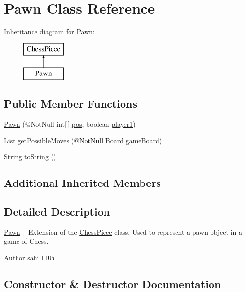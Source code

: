\hypertarget{class_pawn}{}\section{Pawn Class Reference}
\label{class_pawn}
Inheritance diagram for Pawn\+:\begin{figure}[H]
\begin{center}
\leavevmode
\includegraphics[height=2.000000cm]{class_pawn}
\end{center}
\end{figure}
\subsection*{Public Member Functions}
\begin{DoxyCompactItemize}
\item 
\mbox{\hyperlink{class_pawn_a2859eebd000b0e2b0edd2457e2ee6df2}{Pawn}} (@Not\+Null int\mbox{[}$\,$\mbox{]} \mbox{\hyperlink{class_chess_piece_ae9f0da2b5fca2557eab359044a7ba1ac}{pos}}, boolean \mbox{\hyperlink{class_chess_piece_aa8711ff5ce8a45159b9b30c8148a34b2}{player1}})
\item 
List \mbox{\hyperlink{class_pawn_a83c91f2521124c72ba6052425d19a878}{get\+Possible\+Moves}} (@Not\+Null \mbox{\hyperlink{class_board}{Board}} game\+Board)
\item 
String \mbox{\hyperlink{class_pawn_a5f995ad7b8d5d7ad4916ef0515b3649c}{to\+String}} ()
\end{DoxyCompactItemize}
\subsection*{Additional Inherited Members}


\subsection{Detailed Description}
\mbox{\hyperlink{class_pawn}{Pawn}} -- Extension of the \mbox{\hyperlink{class_chess_piece}{Chess\+Piece}} class. Used to represent a pawn object in a game of Chess. \begin{DoxyAuthor}{Author}
sahil1105 
\end{DoxyAuthor}


\subsection{Constructor \& Destructor Documentation}
\mbox{\label{class_pawn_a2859eebd000b0e2b0edd2457e2ee6df2}} 
